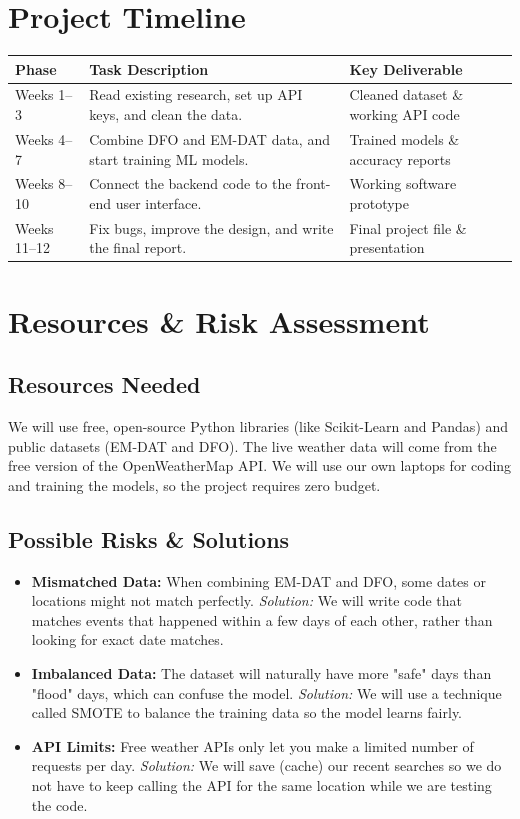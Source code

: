 \documentclass[11pt,a4paper]{article}
\begin{document}
\section{Project Timeline}
\begin{table}[h]
\centering
\begin{tabular}{@{} l p{7.5cm} p{5cm} @{}}
\toprule
\textbf{Phase} & \textbf{Task Description} & \textbf{Key Deliverable} \\ \midrule
Weeks 1--3 & Read existing research, set up API keys, and clean the data. & Cleaned dataset \& working API code \\
Weeks 4--7 & Combine DFO and EM-DAT data, and start training ML models. & Trained models \& accuracy reports \\
Weeks 8--10 & Connect the backend code to the front-end user interface. & Working software prototype \\
Weeks 11--12 & Fix bugs, improve the design, and write the final report. & Final project file \& presentation \\ \bottomrule
\end{tabular}
\end{table}

\section{Resources \& Risk Assessment}
\subsection{Resources Needed}
We will use free, open-source Python libraries (like Scikit-Learn and Pandas) and public datasets (EM-DAT and DFO). The live weather data will come from the free version of the OpenWeatherMap API. We will use our own laptops for coding and training the models, so the project requires zero budget.

\subsection{Possible Risks \& Solutions}
\begin{itemize}
    \item \textbf{Mismatched Data:} When combining EM-DAT and DFO, some dates or locations might not match perfectly. \textit{Solution:} We will write code that matches events that happened within a few days of each other, rather than looking for exact date matches.
    \item \textbf{Imbalanced Data:} The dataset will naturally have more "safe" days than "flood" days, which can confuse the model. \textit{Solution:} We will use a technique called SMOTE to balance the training data so the model learns fairly.
    \item \textbf{API Limits:} Free weather APIs only let you make a limited number of requests per day. \textit{Solution:} We will save (cache) our recent searches so we do not have to keep calling the API for the same location while we are testing the code.
\end{itemize}
\end{document}
